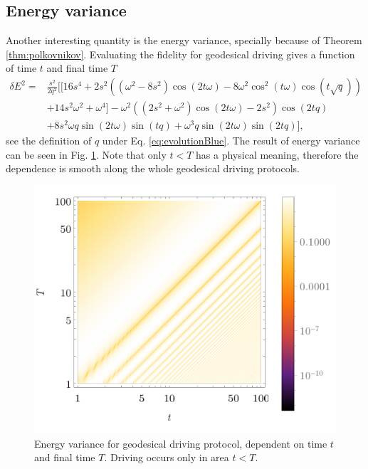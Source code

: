 \subsection{Energy variance}
Another interesting quantity is the energy variance, specially because of Theorem \ref{thm:polkovnikov}. Evaluating the fidelity for geodesical driving gives a function of time $t$ and final time $T$
\begin{equation}
    \begin{split}        
        \delta E^2 =& \frac{s^2}{2 q^2}\Bigg[\Big[16 s^4+2 s^2 \left(\left(\omega ^2-8 s^2\right) \cos (2 t \omega )-8 \omega ^2 \cos ^2(t \omega ) \cos \left(t \sqrt{q}\right)\right)\\
        &+14 s^2 \omega ^2+\omega ^4\Big] -\omega ^2 \left(\left(2 s^2+\omega ^2\right) \cos (2 t \omega )-2 s^2\right) \cos \left(2 t q\right)\\
        & +8 s^2 \omega  q \sin (2 t \omega ) \sin \left(t q\right) + \omega ^3 q \sin (2 t \omega ) \sin \left(2 t q\right) \Bigg],
\end{split}
\end{equation}
see the definition of $q$ under Eq. \ref{eq:evolutionBlue}. The result of energy variance can be seen in Fig. \ref{fig:densVar}. Note that only $t<T$ has a physical meaning, therefore the dependence is smooth along the whole geodesical driving protocols.

\begin{figure}[H]
    \centering
    \includegraphics[scale=1.2]{../img/densVar.pdf}
    \caption{Energy variance for geodesical driving protocol, dependent on time $t$ and final time $T$. Driving occurs only in area $t<T$.}
    \label{fig:densVar}
\end{figure}

